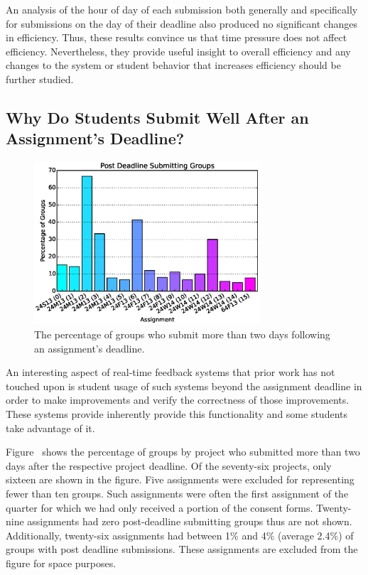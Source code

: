 An analysis of the hour of day of each submission both generally and
specifically for submissions on the day of their deadline also produced no
significant changes in efficiency. Thus, these results convince us that time
pressure does not affect efficiency. Nevertheless, they provide useful insight
to overall efficiency and any changes to the system or student behavior that
increases efficiency should be further studied.

\subsection{Why Do Students Submit Well After an Assignment's Deadline?}

\begin{figure}[!t]
\centering \includegraphics[width=3.3in]{graphs/Post_Deadline_Submitting_Groups.eps}
\caption{The percentage of groups who submit more than two days following an
  assignment's deadline.}
\end{figure}

An interesting aspect of real-time feedback systems that prior work has not
touched upon is student usage of such systems beyond the assignment deadline in
order to make improvements and verify the correctness of those
improvements. These systems provide inherently provide this functionality and
some students take advantage of it.

Figure~ shows the percentage of groups by project who
submitted more than two days after the respective project deadline. Of the
seventy-six projects, only sixteen are shown in the figure. Five assignments
were excluded for representing fewer than ten groups. Such assignments were
often the first assignment of the quarter for which we had only received a
portion of the consent forms. Twenty-nine assignments had zero post-deadline
submitting groups thus are not shown. Additionally, twenty-six assignments had
between 1\% and 4\% (average 2.4\%) of groups with post deadline
submissions. These assignments are excluded from the figure for space purposes.

